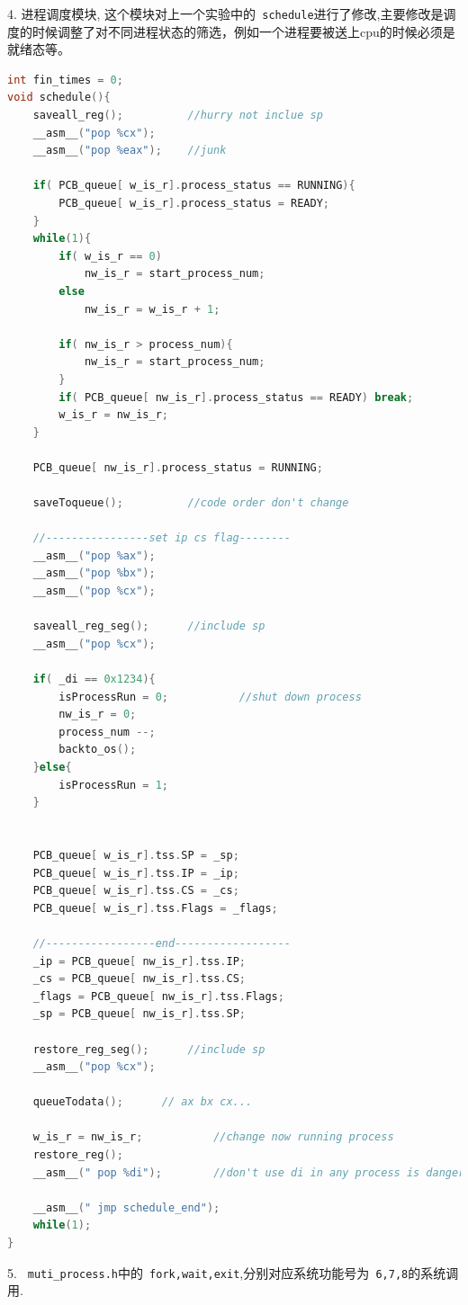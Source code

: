 \documentclass[a4paper]{article}
\begin{document}
{{{\begin{lstlisting}[language={C}]
\end{lstlisting}}
4. 进程调度模块, 这个模块对上一个实验中的\verb| schedule|进行了修改,主要修改是调度的时候调整了对不同进程状态的筛选，例如一个进程要被送上cpu的时候必须是就绪态等。
{\scriptsize
	\begin{lstlisting}[language={C}]
int fin_times = 0;
void schedule(){
    saveall_reg();          //hurry not inclue sp
    __asm__("pop %cx");
    __asm__("pop %eax");    //junk

    if( PCB_queue[ w_is_r].process_status == RUNNING){
        PCB_queue[ w_is_r].process_status = READY;
    }
    while(1){
        if( w_is_r == 0)
            nw_is_r = start_process_num;
        else
            nw_is_r = w_is_r + 1;

        if( nw_is_r > process_num){
            nw_is_r = start_process_num;
        }
        if( PCB_queue[ nw_is_r].process_status == READY) break;
        w_is_r = nw_is_r;
    }

    PCB_queue[ nw_is_r].process_status = RUNNING;

    saveToqueue();          //code order don't change

    //----------------set ip cs flag--------
    __asm__("pop %ax");
    __asm__("pop %bx");
    __asm__("pop %cx");

    saveall_reg_seg();      //include sp
    __asm__("pop %cx");

    if( _di == 0x1234){
        isProcessRun = 0;           //shut down process
        nw_is_r = 0;
        process_num --;
        backto_os();
    }else{
        isProcessRun = 1;
    }


    PCB_queue[ w_is_r].tss.SP = _sp;
    PCB_queue[ w_is_r].tss.IP = _ip;
    PCB_queue[ w_is_r].tss.CS = _cs;
    PCB_queue[ w_is_r].tss.Flags = _flags;

    //-----------------end------------------
    _ip = PCB_queue[ nw_is_r].tss.IP;
    _cs = PCB_queue[ nw_is_r].tss.CS;
    _flags = PCB_queue[ nw_is_r].tss.Flags;
    _sp = PCB_queue[ nw_is_r].tss.SP;

    restore_reg_seg();      //include sp
    __asm__("pop %cx");

    queueTodata();      // ax bx cx...

    w_is_r = nw_is_r;           //change now running process
    restore_reg();
    __asm__(" pop %di");        //don't use di in any process is dangerous

    __asm__(" jmp schedule_end");
    while(1);
}

	\end{lstlisting}
  }
  5. \verb| muti_process.h|中的\verb| fork,wait,exit|,分别对应系统功能号为\verb| 6,7,8|的系统调用.
  {\scriptsize \begin{lstlisting}[language={C}]


\end{lstlisting}}}}
\end{document}

